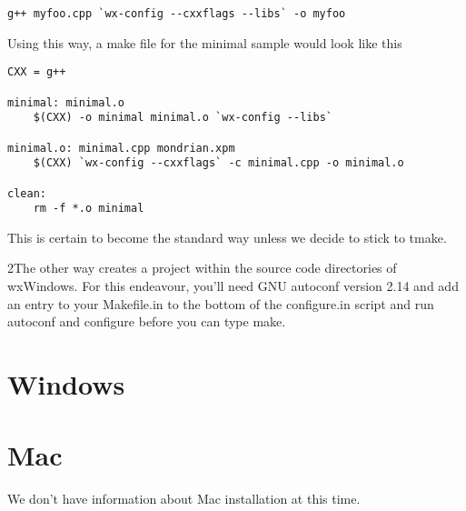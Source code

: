 \begin{verbatim}
g++ myfoo.cpp `wx-config --cxxflags --libs` -o myfoo
\end{verbatim}

Using this way, a make file for the minimal sample would look
like this

\begin{verbatim}
CXX = g++

minimal: minimal.o
    $(CXX) -o minimal minimal.o `wx-config --libs` 

minimal.o: minimal.cpp mondrian.xpm
    $(CXX) `wx-config --cxxflags` -c minimal.cpp -o minimal.o

clean: 
	rm -f *.o minimal
\end{verbatim}

This is certain to become the standard way unless we decide
to stick to tmake.

2\ket The other way creates a project within the source code 
directories of wxWindows. For this endeavour, you'll need
GNU autoconf version 2.14 and add an entry to your Makefile.in
to the bottom of the configure.in script and run autoconf
and configure before you can type make.

\section{Windows}\label{installwindows}


\section{Mac}\label{installmac}

We don't have information about Mac installation at this time.

